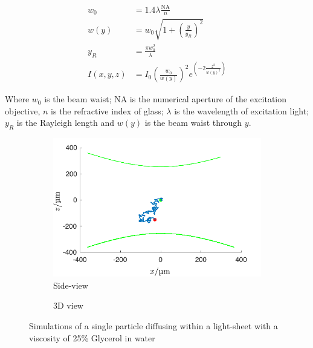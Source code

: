 \begin{align}
  w_0 &= 1.4 \lambda \frac{ \text{NA}}{n}\\
  w(y) &= w_0 \sqrt{1+\left(\frac{y}{y_R}\right)^2}\\
  y_R &= \frac{\pi w_0^2}{\lambda}\\
  I(x,y,z) &= I_0 \left(\frac{w_0}{w(y)}\right)^2 e^{\left(-2\frac{z^2}{w(y)^2}\right)}
\end{align}

Where $w_0$ is the beam waist; NA is the numerical aperture of the excitation objective, $n$ is the refractive index of glass; $\lambda$ is the wavelength of excitation light; $y_R$ is the Rayleigh length and $w(y)$ is the beam waist through $y$.



\begin{figure}
  \centering
  \begin{subfigure}[b]{0.8\linewidth}
    \centering
    \includegraphics{./simulation/size_view_diffusion}
    \caption{Side-view}
    \label{fig:size_view_diffusion}
  \end{subfigure}
  \begin{subfigure}[b]{0.8\linewidth}
    \centering
    \caption{3D view}
    \label{fig:diffusion_3d}
  \end{subfigure}
  \caption{Simulations of a single particle diffusing within a light-sheet with a viscosity of 25\% Glycerol in water}
\end{figure}

